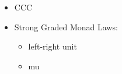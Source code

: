 \documentclass{report}
\begin{document}
    \begin{itemize}
        \item CCC
        \item Strong Graded Monad Laws: \begin{itemize}
            \item left-right unit
            \item mu
            
        \end{itemize}
    \end{itemize}
\end{document}
